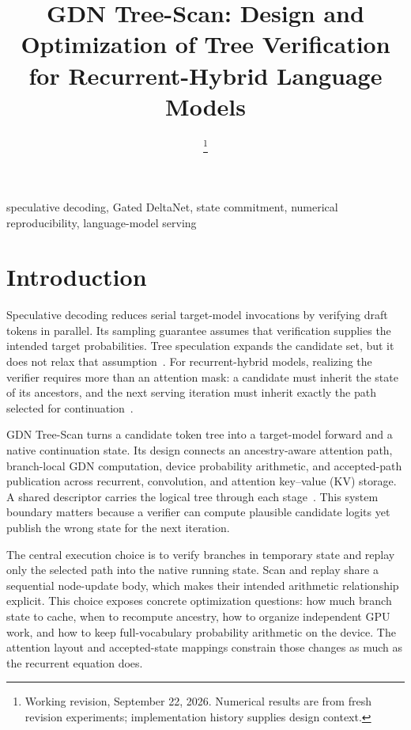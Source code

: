 \documentclass[conference]{IEEEtran}
\newcommand{\sys}{GDN Tree-Scan}
\begin{document}
\title{GDN Tree-Scan: Design and Optimization of Tree Verification for Recurrent-Hybrid Language Models}
\author{
\thanks{Working revision, September 22, 2026. Numerical results are from fresh revision experiments; implementation history supplies design context.}}
\maketitle

\begin{IEEEkeywords}
speculative decoding, Gated DeltaNet, state commitment, numerical reproducibility, language-model serving
\end{IEEEkeywords}

\section{Introduction}
Speculative decoding reduces serial target-model invocations by verifying draft tokens in parallel. Its sampling guarantee assumes that verification supplies the intended target probabilities. Tree speculation expands the candidate set, but it does not relax that assumption~\cite{leviathan2023fast,chen2023sampling,miao2023specinfer}. For recurrent-hybrid models, realizing the verifier requires more than an attention mask: a candidate must inherit the state of its ancestors, and the next serving iteration must inherit exactly the path selected for continuation~\cite{yang2024gated,wu2025stree}.

\sys{} turns a candidate token tree into a target-model forward and a native continuation state. Its design connects an ancestry-aware attention path, branch-local GDN computation, device probability arithmetic, and accepted-path publication across recurrent, convolution, and attention key--value (KV) storage. A shared descriptor carries the logical tree through each stage~\cite{lumo2026archive,lumo2026stateless}. This system boundary matters because a verifier can compute plausible candidate logits yet publish the wrong state for the next iteration.

The central execution choice is to verify branches in temporary state and replay only the selected path into the native running state. Scan and replay share a sequential node-update body, which makes their intended arithmetic relationship explicit. This choice exposes concrete optimization questions: how much branch state to cache, when to recompute ancestry, how to organize independent GPU work, and how to keep full-vocabulary probability arithmetic on the device. The attention layout and accepted-state mappings constrain those changes as much as the recurrent equation does.
\end{document}
